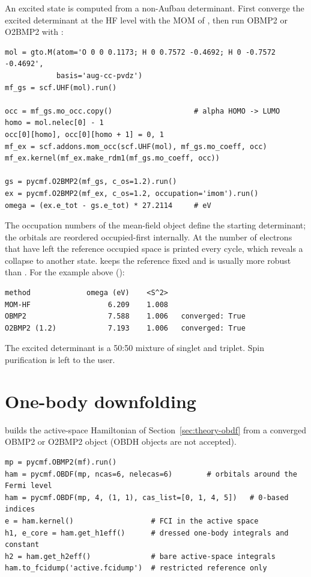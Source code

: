 An excited state is computed from a non-Aufbau determinant. First converge
the excited determinant at the HF level with the MOM of \pyscf{}, then run
OBMP2 or O2BMP2 with :

\begin{lstlisting}[style=python]
mol = gto.M(atom='O 0 0 0.1173; H 0 0.7572 -0.4692; H 0 -0.7572 -0.4692',
            basis='aug-cc-pvdz')
mf_gs = scf.UHF(mol).run()

occ = mf_gs.mo_occ.copy()                   # alpha HOMO -> LUMO
homo = mol.nelec[0] - 1
occ[0][homo], occ[0][homo + 1] = 0, 1
mf_ex = scf.addons.mom_occ(scf.UHF(mol), mf_gs.mo_coeff, occ)
mf_ex.kernel(mf_ex.make_rdm1(mf_gs.mo_coeff, occ))

gs = pycmf.O2BMP2(mf_gs, c_os=1.2).run()
ex = pycmf.O2BMP2(mf_ex, c_os=1.2, occupation='imom').run()
omega = (ex.e_tot - gs.e_tot) * 27.2114     # eV
\end{lstlisting}

The occupation numbers  of the mean-field object define the
starting determinant; the orbitals are reordered occupied-first internally.
At  the number of electrons that have left the reference
occupied space is printed every cycle, which reveals a collapse to another
state.  keeps the reference fixed and is usually more robust
than . For the example above ():

\begin{lstlisting}[style=output]
method             omega (eV)    <S^2>
MOM-HF                  6.209    1.008
OBMP2                   7.588    1.006   converged: True
O2BMP2 (1.2)            7.193    1.006   converged: True
\end{lstlisting}

The excited determinant is a 50:50 mixture of singlet and triplet. Spin
purification is left to the user.

\section{One-body downfolding}
\label{sec:obdf}

 builds the active-space Hamiltonian of
Section~\ref{sec:theory-obdf} from a converged OBMP2 or O2BMP2 object (OBDH
objects are not accepted).

\begin{lstlisting}[style=python]
mp = pycmf.OBMP2(mf).run()
ham = pycmf.OBDF(mp, ncas=6, nelecas=6)        # orbitals around the Fermi level
ham = pycmf.OBDF(mp, 4, (1, 1), cas_list=[0, 1, 4, 5])   # 0-based indices
e = ham.kernel()                  # FCI in the active space
h1, e_core = ham.get_h1eff()      # dressed one-body integrals and constant
h2 = ham.get_h2eff()              # bare active-space integrals
ham.to_fcidump('active.fcidump')  # restricted reference only
\end{lstlisting}

